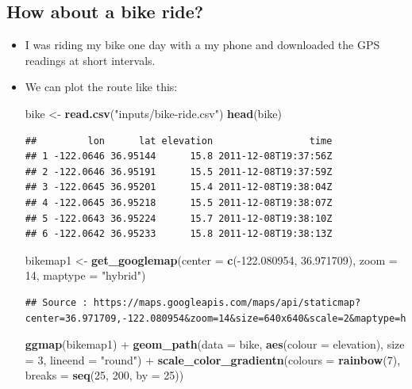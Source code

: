 \documentclass[]{book}
\newenvironment{Shaded}{\begin{snugshade}}{\end{snugshade}}
\newcommand{\KeywordTok}[1]{\textcolor[rgb]{0.13,0.29,0.53}{\textbf{{#1}}}}
\newcommand{\DataTypeTok}[1]{\textcolor[rgb]{0.13,0.29,0.53}{{#1}}}
\newcommand{\DecValTok}[1]{\textcolor[rgb]{0.00,0.00,0.81}{{#1}}}
\newcommand{\FloatTok}[1]{\textcolor[rgb]{0.00,0.00,0.81}{{#1}}}
\newcommand{\StringTok}[1]{\textcolor[rgb]{0.31,0.60,0.02}{{#1}}}
\newcommand{\NormalTok}[1]{{#1}}
\theoremstyle{definition}
\theoremstyle{definition}
\theoremstyle{remark}
\begin{document}
\subsection{How about a bike ride?}\label{how-about-a-bike-ride}

\begin{itemize}
\item
  I was riding my bike one day with a my phone and downloaded the GPS
  readings at short intervals.
\item
  We can plot the route like this:

\begin{Shaded}
\begin{Highlighting}[]
\NormalTok{bike <-}\StringTok{ }\KeywordTok{read.csv}\NormalTok{(}\StringTok{"inputs/bike-ride.csv"}\NormalTok{)}
\KeywordTok{head}\NormalTok{(bike)}
\end{Highlighting}
\end{Shaded}

\begin{verbatim}
##         lon      lat elevation                 time
## 1 -122.0646 36.95144      15.8 2011-12-08T19:37:56Z
## 2 -122.0646 36.95191      15.5 2011-12-08T19:37:59Z
## 3 -122.0645 36.95201      15.4 2011-12-08T19:38:04Z
## 4 -122.0645 36.95218      15.5 2011-12-08T19:38:07Z
## 5 -122.0643 36.95224      15.7 2011-12-08T19:38:10Z
## 6 -122.0642 36.95233      15.8 2011-12-08T19:38:13Z
\end{verbatim}

\begin{Shaded}
\begin{Highlighting}[]
\NormalTok{bikemap1 <-}\StringTok{ }\KeywordTok{get_googlemap}\NormalTok{(}\DataTypeTok{center =} \KeywordTok{c}\NormalTok{(-}\FloatTok{122.080954}\NormalTok{, }\FloatTok{36.971709}\NormalTok{), }\DataTypeTok{zoom =} \DecValTok{14}\NormalTok{, }\DataTypeTok{maptype =} \StringTok{"hybrid"}\NormalTok{)}
\end{Highlighting}
\end{Shaded}

\begin{verbatim}
## Source : https://maps.googleapis.com/maps/api/staticmap?center=36.971709,-122.080954&zoom=14&size=640x640&scale=2&maptype=hybrid
\end{verbatim}

\begin{Shaded}
\begin{Highlighting}[]
\KeywordTok{ggmap}\NormalTok{(bikemap1) +}\StringTok{ }
\StringTok{  }\KeywordTok{geom_path}\NormalTok{(}\DataTypeTok{data =} \NormalTok{bike, }\KeywordTok{aes}\NormalTok{(}\DataTypeTok{colour =} \NormalTok{elevation), }\DataTypeTok{size =} \DecValTok{3}\NormalTok{, }\DataTypeTok{lineend =} \StringTok{"round"}\NormalTok{) +}\StringTok{ }
\StringTok{  }\KeywordTok{scale_color_gradientn}\NormalTok{(}\DataTypeTok{colours =} \KeywordTok{rainbow}\NormalTok{(}\DecValTok{7}\NormalTok{), }\DataTypeTok{breaks =} \KeywordTok{seq}\NormalTok{(}\DecValTok{25}\NormalTok{, }\DecValTok{200}\NormalTok{, }\DataTypeTok{by =} \DecValTok{25}\NormalTok{))}
\end{Highlighting}
\end{Shaded}


\end{itemize}
\end{document}
